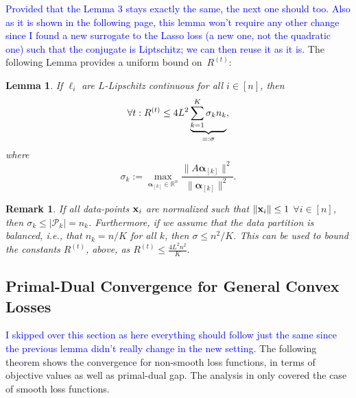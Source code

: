 \documentclass{article}
\newcommand{\eqdef}{:=}
\newcommand{\R}{\mathbb{R}}                      %
\newcommand{\xv}{ {\bf x}}
\newcommand{\alphav}{ {\boldsymbol \alpha}}
\newcommand{\0}{ {\bf 0}}
\newcommand{\vsubset}[2]{#1_{[#2]}}
\newcommand{\vc}[2]{#1^{(#2)}}                   %
\theoremstyle{plain}
\newtheorem{lemma}[theorem]{Lemma}
\newtheorem{remark}[theorem]{Remark}
\theoremstyle{definition}
\begin{document}
\textcolor{blue}{Provided that the Lemma 3 stays exactly the same, the next one should too.
Also as it is shown in the following page, this lemma won't require any other change since I found a new
surrogate to the Lasso loss (a new one, not the quadratic one) such that the conjugate is Liptschitz;
we can then reuse it as it is.}
The following Lemma provides a uniform bound on~$\vc{R}{t}$:
\begin{lemma}
\label{lemma:BoundOnR}
If $\ell_i$ are $L$-Lipschitz 
continuous for all $i\in [n]$, then\vspace{-3mm}
\begin{equation}
\label{eq:asfjoewjofa}
\forall t: 
\vc{R}{t}
\leq 4L^2 
\underbrace{\sum _{k=1}^K 
\sigma_k  n_k}_{=: \sigma}, \vspace{-2mm} %
\end{equation}
where\vspace{-1mm}
\begin{equation}
\label{eq:definitionOfSigmaK}
\sigma_k \eqdef
 \max_{\vsubset{\alphav}{k} \in \R^n}
 \frac{\|A \vsubset{\alphav}{k}\|^2}{
 \|\vsubset{\alphav}{k}\|^2}.
\end{equation}
\end{lemma}

\begin{remark}
\label{rmk:asfwaefwae}
If all data-points $\xv_i$ are normalized such that
$\|\xv_i\|\leq 1$ $\forall i\in [n]$, then
$\sigma_k \leq |\mathcal{P}_k| = n_k$.
Furthermore, if we assume that the data partition is balanced, i.e., that 
$n_k = n/K$ for all $k$, then $\sigma \le n^2/K$. This can be used to bound the constants $\vc{R}{t}$, above, as  
$
\vc{R}{t} \leq  \frac{4L^2 n^2}{K}.$
\end{remark}

 

\subsection{Primal-Dual Convergence for General Convex Losses}
\textcolor{blue}{I skipped over this section as here everything should follow just the same since the previous lemma didn't
really change in the new setting.}
The following theorem shows the convergence for non-smooth loss functions, in terms of objective values as well as primal-dual gap.
The analysis in \cite{jaggi2014communication} only covered the case of smooth loss functions.
\end{document}
